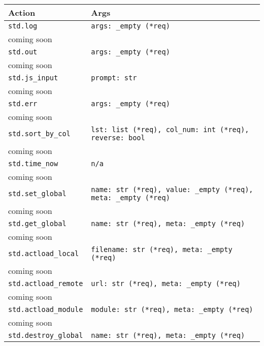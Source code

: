 \begin{longtable}{|p{4cm} | p{6cm}|}\toprule\rowcolor{white}\textbf{Action}&\textbf{Args}\\\midrule\lstinline$std.log$ & \lstinline$args: _empty (*req)$ \\ \hline
\multicolumn{2}{|l|}{coming soon} \\ \hline
\lstinline$std.out$ & \lstinline$args: _empty (*req)$ \\ \hline
\multicolumn{2}{|l|}{coming soon} \\ \hline
\lstinline$std.js_input$ & \lstinline$prompt: str$ \\ \hline
\multicolumn{2}{|l|}{coming soon} \\ \hline
\lstinline$std.err$ & \lstinline$args: _empty (*req)$ \\ \hline
\multicolumn{2}{|l|}{coming soon} \\ \hline
\lstinline$std.sort_by_col$ & \lstinline$lst: list (*req), col_num: int (*req), reverse: bool$ \\ \hline
\multicolumn{2}{|l|}{coming soon} \\ \hline
\lstinline$std.time_now$ & \lstinline$n/a$ \\ \hline
\multicolumn{2}{|l|}{coming soon} \\ \hline
\lstinline$std.set_global$ & \lstinline$name: str (*req), value: _empty (*req), meta: _empty (*req)$ \\ \hline
\multicolumn{2}{|l|}{coming soon} \\ \hline
\lstinline$std.get_global$ & \lstinline$name: str (*req), meta: _empty (*req)$ \\ \hline
\multicolumn{2}{|l|}{coming soon} \\ \hline
\lstinline$std.actload_local$ & \lstinline$filename: str (*req), meta: _empty (*req)$ \\ \hline
\multicolumn{2}{|l|}{coming soon} \\ \hline
\lstinline$std.actload_remote$ & \lstinline$url: str (*req), meta: _empty (*req)$ \\ \hline
\multicolumn{2}{|l|}{coming soon} \\ \hline
\lstinline$std.actload_module$ & \lstinline$module: str (*req), meta: _empty (*req)$ \\ \hline
\multicolumn{2}{|l|}{coming soon} \\ \hline
\lstinline$std.destroy_global$ & \lstinline$name: str (*req), meta: _empty (*req)$ \\ \hline

\end{longtable}
